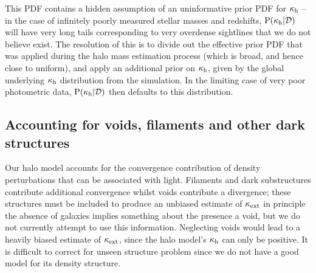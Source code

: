 \documentclass[useAMS,usenatbib]{mn2e}
\begin{document}
This PDF contains a hidden assumption of an uninformative prior PDF for
$\kappa_{\rm h}$ -- in the case of infinitely poorly measured stellar masses and
redshifts, ${\rm P}(\kappa_{\rm h}|{\mathcal{D}})$ will have very long tails corresponding to
very overdense sightlines that we do not believe exist. The resolution of this
is to divide out the effective prior PDF that was applied during the halo mass
estimation process (which is broad, and hence close to uniform), and apply an
additional prior on $\kappa_{\rm h}$, given by the global underlying $\kappa_{\rm h}$
distribution from the simulation. In the limiting  case of very poor
photometric data, ${\rm P}(\kappa_{\rm h}|{\mathcal{D}})$ then defaults to this distribution.





\subsection{Accounting for voids, filaments and other dark structures}
\label{sec:model:voids}

Our halo model accounts for the convergence contribution of density perturbations that can
be associated with light. Filaments and dark substructures contribute additional convergence
whilst voids contribute a divergence; these structures must be included to produce an unbiased estimate of $\kappa_{\rm ext}$
in principle the absence of galaxies implies something about
the presence a void, but we do not currently attempt to use this information. Neglecting voids
would lead to a heavily biased estimate of $\kappa_{\rm ext}$, since the halo model's $\kappa_{\rm h}$
can only be positive. It is difficult to correct for unseen structure problem
since we do not have a good model for its density structure.
\end{document}
